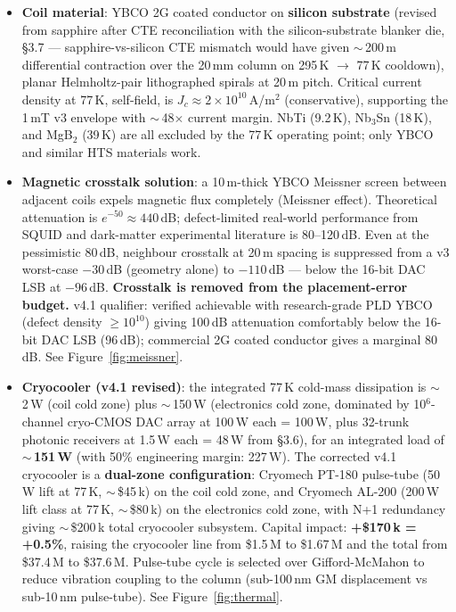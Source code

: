 \documentclass[11pt,letterpaper]{article}
\begin{document}
\begin{itemize}[leftmargin=1.6em]
  \item \textbf{Coil material}: YBCO 2G coated conductor on \textbf{silicon substrate} (revised from sapphire after CTE reconciliation with the silicon-substrate blanker die, \S 3.7 --- sapphire-vs-silicon CTE mismatch would have given $\sim$\,200\,\textmu m differential contraction over the 20\,mm column on 295\,K $\to$ 77\,K cooldown), planar Helmholtz-pair lithographed spirals at 20\,\textmu m pitch. Critical current density at 77\,K, self-field, is $J_c \approx 2 \times 10^{10}$\,A/m$^2$ (conservative), supporting the 1\,mT v3 envelope with $\sim$\,48$\times$ current margin. NbTi (9.2\,K), Nb$_3$Sn (18\,K), and MgB$_2$ (39\,K) are all excluded by the 77\,K operating point; only YBCO and similar HTS materials work.

  \item \textbf{Magnetic crosstalk solution}: a 10\,\textmu m-thick YBCO Meissner screen between adjacent coils expels magnetic flux completely (Meissner effect). Theoretical attenuation is $e^{-50} \approx 440$\,dB; defect-limited real-world performance from SQUID and dark-matter experimental literature is 80--120\,dB. Even at the pessimistic 80\,dB, neighbour crosstalk at 20\,\textmu m spacing is suppressed from a v3 worst-case $-30$\,dB (geometry alone) to $-110$\,dB --- below the 16-bit DAC LSB at $-96$\,dB. \textbf{Crosstalk is removed from the placement-error budget.} v4.1 qualifier: verified achievable with research-grade PLD YBCO (defect density $\geq 10^{10}$) giving 100\,dB attenuation comfortably below the 16-bit DAC LSB (96\,dB); commercial 2G coated conductor gives a marginal 80\,dB. See Figure~\ref{fig:meissner}.

  \item \textbf{Cryocooler (v4.1 revised)}: the integrated 77\,K cold-mass dissipation is $\sim$\,2\,W (coil cold zone) plus $\sim$\,150\,W (electronics cold zone, dominated by 10$^6$-channel cryo-CMOS DAC array at 100\,\textmu W each = 100\,W, plus 32-trunk photonic receivers at 1.5\,W each = 48\,W from \S 3.6), for an integrated load of \textbf{$\sim$\,151\,W} (with 50\% engineering margin: 227\,W). The corrected v4.1 cryocooler is a \textbf{dual-zone configuration}: Cryomech PT-180 pulse-tube (50\,W lift at 77\,K, $\sim$\,\$45\,k) on the coil cold zone, and Cryomech AL-200 (200\,W lift class at 77\,K, $\sim$\,\$80\,k) on the electronics cold zone, with N+1 redundancy giving $\sim$\,\$200\,k total cryocooler subsystem. Capital impact: \textbf{+\$170\,k = +0.5\%}, raising the cryocooler line from \$1.5\,M to \$1.67\,M and the total from \$37.4\,M to \$37.6\,M. Pulse-tube cycle is selected over Gifford-McMahon to reduce vibration coupling to the column (sub-100\,nm GM displacement vs sub-10\,nm pulse-tube). See Figure~\ref{fig:thermal}.


\end{itemize}
\end{document}
